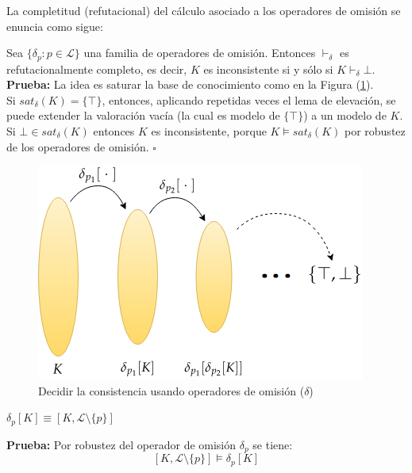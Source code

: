 La completitud (refutacional) del cálculo asociado a los operadores de omisión se enuncia como sigue:

\thm \label{teo:completo} Sea $\{ \delta_p : p \in \mathcal{L} \}$ una familia de operadores de omisión. Entonces $\vdash_{\delta}$ es refutacionalmente completo, es decir, $K$ es inconsistente si y sólo si $K \vdash_{\delta} \bot$.\\

\noindent \textbf{Prueba:} La idea es saturar la base de conocimiento como en la Figura (\ref{fig:comple}). \\ 
Si $sat_{\delta} (K) = \{ \top \}$, entonces, aplicando repetidas veces el lema de elevación, se puede extender la valoración vacía (la cual es modelo de $\{ \top \}$) a un modelo de $K$.\\
Si $\bot \in sat_{\delta} (K)$ entonces $K$ es inconsistente, porque $K \vDash sat_{\delta} (K)$ por robustez de los operadores de omisión. $\square$ %

\vspace{0.5cm}
\begin{figure}[h]
	\centering
		\includegraphics[scale=0.8]{imagenes/comple.png}
	\caption{Decidir la consistencia usando operadores de omisión ($\delta$)}
	\label{fig:comple}
\end{figure}
\vspace{0.5cm}

\cor \label{cor:omitep} $\delta_p [K] \equiv [K, \mathcal{L} \setminus \{ p \}]$

\noindent \textbf{Prueba:} Por robustez del operador de omisión $\delta_p$ se tiene:
$$[K, \mathcal{L} \setminus \{ p \}] \vDash \delta_p [K]$$

